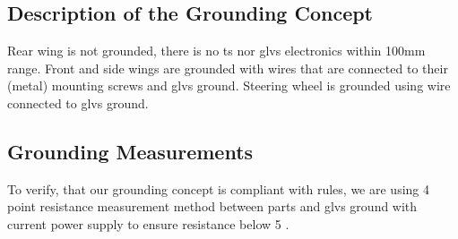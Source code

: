 \subsection{Description of the Grounding Concept}
Rear wing is not grounded, there is no \gls{ts} nor \gls{glvs} electronics within 100mm range.
Front and side wings are grounded with wires that are connected to their (metal) mounting screws and \gls{glvs} ground.
Steering wheel is grounded using wire connected to \gls{glvs} ground.

\subsection{Grounding Measurements}
To verify, that our grounding concept is compliant with rules, we are using 4 point resistance measurement method between parts and \gls{glvs} ground with current power supply to ensure resistance below 5 \ohm.
